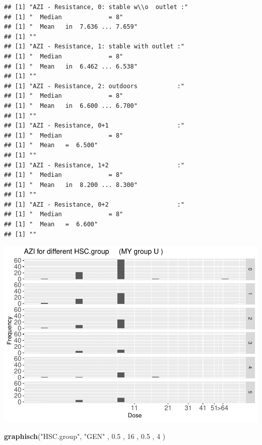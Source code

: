 \documentclass[
]{article}
\newenvironment{Shaded}{\begin{snugshade}}{\end{snugshade}}
\newcommand{\DecValTok}[1]{\textcolor[rgb]{0.00,0.00,0.81}{#1}}
\newcommand{\FloatTok}[1]{\textcolor[rgb]{0.00,0.00,0.81}{#1}}
\newcommand{\KeywordTok}[1]{\textcolor[rgb]{0.13,0.29,0.53}{\textbf{#1}}}
\newcommand{\NormalTok}[1]{#1}
\newcommand{\StringTok}[1]{\textcolor[rgb]{0.31,0.60,0.02}{#1}}
\begin{document}
\begin{verbatim}
## [1] "AZI - Resistance, 0: stable w\\o  outlet :"
## [1] "  Median             = 8"
## [1] "  Mean   in  7.636 ... 7.659"
## [1] ""
## [1] "AZI - Resistance, 1: stable with outlet :"
## [1] "  Median             = 8"
## [1] "  Mean   in  6.462 ... 6.538"
## [1] ""
## [1] "AZI - Resistance, 2: outdoors           :"
## [1] "  Median             = 8"
## [1] "  Mean   in  6.600 ... 6.700"
## [1] ""
## [1] "AZI - Resistance, 0+1                   :"
## [1] "  Median             = 8"
## [1] "  Mean   =  6.500"
## [1] ""
## [1] "AZI - Resistance, 1+2                   :"
## [1] "  Median             = 8"
## [1] "  Mean   in  8.200 ... 8.300"
## [1] ""
## [1] "AZI - Resistance, 0+2                   :"
## [1] "  Median             = 8"
## [1] "  Mean   =  6.600"
## [1] ""
\end{verbatim}

\includegraphics{Verteilungen_files/figure-latex/unnamed-chunk-47-1.pdf}

\begin{Shaded}
\begin{Highlighting}[]
   \KeywordTok{graphisch}\NormalTok{(}\StringTok{"HSC.group"}\NormalTok{, }\StringTok{"GEN"}\NormalTok{ , }\FloatTok{0.5}\NormalTok{  ,  }\DecValTok{16}\NormalTok{   ,   }\FloatTok{0.5}\NormalTok{  ,   }\DecValTok{4}\NormalTok{    )}
\end{Highlighting}
\end{Shaded}
\end{document}
